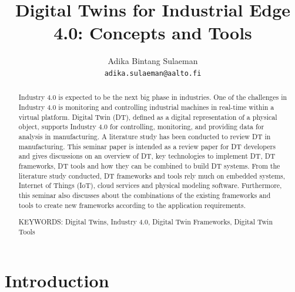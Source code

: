 \documentclass[article,table]{aaltoseries}
\begin{document}
 

\title{Digital Twins for Industrial Edge 4.0: Concepts and Tools}

\author{Adika Bintang Sulaeman%
\\\textnormal{\texttt{adika.sulaeman@aalto.fi}}} %


\maketitle


\begin{abstract}
  Industry 4.0 is expected to be the next big phase in industries. One of the challenges in Industry 4.0 is monitoring and controlling industrial machines in real-time within a virtual platform. Digital Twin (DT), defined as a digital representation of a physical object, supports Industry 4.0 for controlling, monitoring, and providing data for analysis in manufacturing. A literature study has been conducted to review DT in manufacturing. This seminar paper is intended as a review paper for DT developers and gives discussions on an overview of DT, key technologies to implement DT, DT frameworks, DT tools and how they can be combined to build DT systems. From the literature study conducted, DT frameworks and tools rely much on embedded systems, Internet of Things (IoT), cloud services and physical modeling software. Furthermore, this seminar also discusses about the combinations of the existing frameworks and tools to create new frameworks according to the application requirements.
  
\vspace{3mm}
\noindent KEYWORDS: Digital Twins, Industry 4.0, Digital Twin Frameworks, Digital Twin Tools

\end{abstract}




\section{Introduction}
\end{document}

